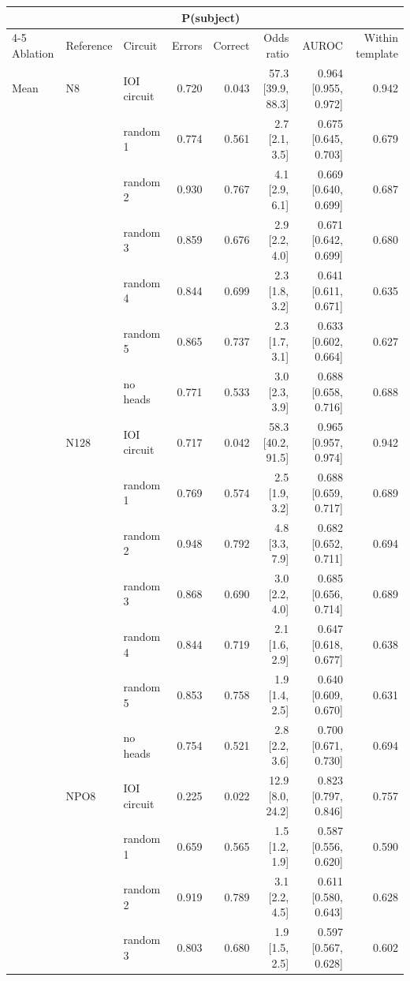 \begin{tabular}{@{}lllrrrrr@{}}
\toprule
 & & & \multicolumn{2}{c}{P(subject)} & & & \\
\cmidrule(lr){4-5}
Ablation & Reference & Circuit & Errors & Correct & Odds ratio & AUROC & Within template \\
\midrule
Mean & N8 & IOI circuit & 0.720 & 0.043 & 57.3 [39.9, 88.3] & 0.964 [0.955, 0.972] & 0.942 \\
 &  & random 1 & 0.774 & 0.561 & 2.7 [2.1, 3.5] & 0.675 [0.645, 0.703] & 0.679 \\
 &  & random 2 & 0.930 & 0.767 & 4.1 [2.9, 6.1] & 0.669 [0.640, 0.699] & 0.687 \\
 &  & random 3 & 0.859 & 0.676 & 2.9 [2.2, 4.0] & 0.671 [0.642, 0.699] & 0.680 \\
 &  & random 4 & 0.844 & 0.699 & 2.3 [1.8, 3.2] & 0.641 [0.611, 0.671] & 0.635 \\
 &  & random 5 & 0.865 & 0.737 & 2.3 [1.7, 3.1] & 0.633 [0.602, 0.664] & 0.627 \\
 &  & no heads & 0.771 & 0.533 & 3.0 [2.3, 3.9] & 0.688 [0.658, 0.716] & 0.688 \\
\addlinespace[2pt]
 & N128 & IOI circuit & 0.717 & 0.042 & 58.3 [40.2, 91.5] & 0.965 [0.957, 0.974] & 0.942 \\
 &  & random 1 & 0.769 & 0.574 & 2.5 [1.9, 3.2] & 0.688 [0.659, 0.717] & 0.689 \\
 &  & random 2 & 0.948 & 0.792 & 4.8 [3.3, 7.9] & 0.682 [0.652, 0.711] & 0.694 \\
 &  & random 3 & 0.868 & 0.690 & 3.0 [2.2, 4.0] & 0.685 [0.656, 0.714] & 0.689 \\
 &  & random 4 & 0.844 & 0.719 & 2.1 [1.6, 2.9] & 0.647 [0.618, 0.677] & 0.638 \\
 &  & random 5 & 0.853 & 0.758 & 1.9 [1.4, 2.5] & 0.640 [0.609, 0.670] & 0.631 \\
 &  & no heads & 0.754 & 0.521 & 2.8 [2.2, 3.6] & 0.700 [0.671, 0.730] & 0.694 \\
\addlinespace[2pt]
 & NPO8 & IOI circuit & 0.225 & 0.022 & 12.9 [8.0, 24.2] & 0.823 [0.797, 0.846] & 0.757 \\
 &  & random 1 & 0.659 & 0.565 & 1.5 [1.2, 1.9] & 0.587 [0.556, 0.620] & 0.590 \\
 &  & random 2 & 0.919 & 0.789 & 3.1 [2.2, 4.5] & 0.611 [0.580, 0.643] & 0.628 \\
 &  & random 3 & 0.803 & 0.680 & 1.9 [1.5, 2.5] & 0.597 [0.567, 0.628] & 0.602 \\

\end{tabular}
